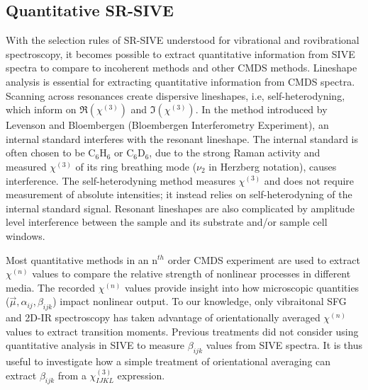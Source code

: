 \documentclass[aip, jcp, draft, onecolumn]{revtex4-2}
\begin{document}
\subsection{Quantitative SR-SIVE}
With the selection rules of SR-SIVE understood for vibrational and rovibrational spectroscopy, it becomes possible to extract quantitative information from SIVE spectra to compare to incoherent methods and other CMDS methods.
Lineshape analysis is essential for extracting quantitative information from CMDS spectra.
Scanning across resonances create dispersive lineshapes, i.e, self-heterodyning, which inform on $\Re(\chi^{(3)})$ and $\Im(\chi^{(3)})$.\cite{Levenson1974_1, Levenson1974_2}
In the method introduced by Levenson and Bloembergen (Bloembergen Interferometry Experiment), an internal standard interferes with the resonant lineshape.
The internal standard is often chosen to be C$_6$H$_6$ or C$_6$D$_6$, due to the strong Raman activity and measured $\chi^{(3)}$ of its ring breathing mode ($\nu_2$ in Herzberg notation), causes interference. \cite{Levenson1974_2, RN351, RN345}
The self-heterodyning method measures $\chi^{(3)}$ and does not require measurement of absolute intensities; it instead relies on self-heterodyning of the internal standard signal. 
Resonant lineshapes are also complicated by amplitude level interference between the sample and its substrate and/or sample cell windows. \cite{RN362, RN418}

Most quantitative methods in an n$^{th}$ order CMDS experiment are used to extract $\chi^{(n)}$ values to compare the relative strength of nonlinear processes in different media. \cite{Zhu87, RN351, RN345}
The recorded $\chi^{(n)}$ values provide insight into how microscopic quantities ($\vec{\mu}, \alpha_{ij}, \beta_{ijk}$) impact nonlinear output.
To our knowledge, only vibraitonal SFG and 2D-IR spectroscopy has taken advantage of orientationally averaged $\chi^{(n)}$ values to extract transition moments. \cite{Shen90, Moilanen2009, RN245}
Previous treatments did not consider using quantitative analysis in SIVE to measure $\beta_{ijk}$ values from SIVE spectra.
It is thus useful to investigate how a simple treatment of orientational averaging can extract $\beta_{ijk}$ from a $\chi^{(3)}_{IJKL}$ expression.
\end{document}
